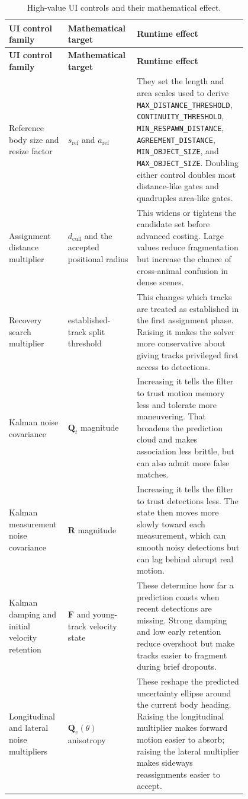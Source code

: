 \documentclass[11pt]{article}
\newcommand{\runtimekey}[1]{\texttt{#1}}
\begin{document}
\begin{longtable}{L{0.19\linewidth} L{0.19\linewidth} L{0.42\linewidth}}
\caption{High-value UI controls and their mathematical effect.}\label{tab:ui-math-impact}\\
\toprule
\textbf{UI control family} & \textbf{Mathematical target} & \textbf{Runtime effect} \\
\midrule
\endfirsthead
\toprule
\textbf{UI control family} & \textbf{Mathematical target} & \textbf{Runtime effect} \\
\midrule
\endhead
Reference body size and resize factor & $s_{\text{ref}}$ and $a_{\text{ref}}$ & They set the length and area scales used to derive \runtimekey{MAX\_DISTANCE\_THRESHOLD}, \runtimekey{CONTINUITY\_THRESHOLD}, \runtimekey{MIN\_RESPAWN\_DISTANCE}, \runtimekey{AGREEMENT\_DISTANCE}, \runtimekey{MIN\_OBJECT\_SIZE}, and \runtimekey{MAX\_OBJECT\_SIZE}. Doubling either control doubles most distance-like gates and quadruples area-like gates. \\
Assignment distance multiplier & $d_{\text{cull}}$ and the accepted positional radius & This widens or tightens the candidate set before advanced costing. Large values reduce fragmentation but increase the chance of cross-animal confusion in dense scenes. \\
Recovery search multiplier & established-track split threshold & This changes which tracks are treated as established in the first assignment phase. Raising it makes the solver more conservative about giving tracks privileged first access to detections. \\
Kalman noise covariance & $\mathbf{Q}_t$ magnitude & Increasing it tells the filter to trust motion memory less and tolerate more maneuvering. That broadens the prediction cloud and makes association less brittle, but can also admit more false matches. \\
Kalman measurement noise covariance & $\mathbf{R}$ magnitude & Increasing it tells the filter to trust detections less. The state then moves more slowly toward each measurement, which can smooth noisy detections but can lag behind abrupt real motion. \\
Kalman damping and initial velocity retention & $\mathbf{F}$ and young-track velocity state & These determine how far a prediction coasts when recent detections are missing. Strong damping and low early retention reduce overshoot but make tracks easier to fragment during brief dropouts. \\
Longitudinal and lateral noise multipliers & $\mathbf{Q}_v(\theta)$ anisotropy & These reshape the predicted uncertainty ellipse around the current body heading. Raising the longitudinal multiplier makes forward motion easier to absorb; raising the lateral multiplier makes sideways reassignments easier to accept. \\

\end{longtable}
\end{document}
